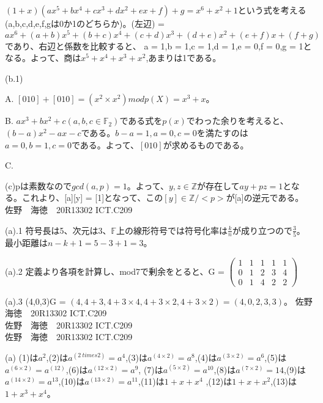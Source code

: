 \documentclass[11pt]{jsarticle}
\begin{document}
$(1 + x)(ax^5 + bx^4 + cx^3 + dx^2 + ex + f) + g = x^6 + x^2 + 1$という式を考える(a,b,c,d,e,f,gは0か1のどちらか)。(左辺) = $ax^6 + (a + b)x^5 + (b + c)x^4 + (c + d)x^3 + (d + e)x^2 + (e + f)x + (f + g)$であり、右辺と係数を比較すると、
a = 1,b = 1,c = 1,d = 1,e = 0,f = 0,g = 1となる。よって、商は$x^5 + x^4 + x^3 + x^2$,あまりは1である。
\par (b.1)
\par A. $[010] + [010] = (x^2 \times x^2) mod p(X) = x^3 + x$。
\par B. $ax^3 + bx^2 + c(a,b,c \in \mathbb{F}_2)$である式を$p(x)$でわった余りを考えると、$(b - a)x^2 - ax - c$である。$b - a = 1,a = 0,c = 0$を満たすのは$a = 0,b = 1,c = 0$である。よって、$[010]$が求めるものである。
\par C.
\par (c)pは素数なので$gcd(a,p) = 1$。よって、$y,z \in \mathbb{Z}$が存在して$ ay + pz = 1 $となる。これより、[a][y] = [1]となって、この$[y] \in \mathbb{Z} / <p>$が[a]の逆元である。\newpage
佐野　海徳　20R13302 ICT.C209 \\
\par (a).1 符号長は5、次元は3、$\mathbb{F}$上の線形符号では符号化率は$\frac{k}{n}$が成り立つので$\frac{3}{5}$。最小距離は$n - k + 1 = 5 - 3 + 1 = 3$。
\par (a).2 定義より各項を計算し、mod7で剰余をとると、G = $\left(
\begin{array}{ccccc}
1 & 1 & 1 & 1 & 1 \\
0 & 1 & 2 & 3 & 4 \\
0 & 1 & 4 & 2 & 2
\end{array}
\right)$
\par (a).3 (4,0,3)G = $(4, 4 + 3, 4 + 3 \times 4, 4 + 3 \times 2, 4 + 3 \times 2) = (4,0,2,3,3)$。\newpage
佐野　海徳　20R13302 ICT.C209 \\
\newpage
佐野　海徳　20R13302 ICT.C209 \\
\newpage
佐野　海徳　20R13302 ICT.C209 \\
\par (a) (1)は$a^2$,(2)は$a^(2\ times 2) = a^4$,(3)は$a^(4\times 2) = a^8$,(4)は$a^(3 \times 2) = a^6$,(5)は$a^(6 \times 2) = a^(12)$,(6)は$a^(12 \times 2) = a^9$,
(7)は$a^(5 \times 2) = a^10$,(8)は$a^(7 \times 2) = 14$,(9)は$a^(14 \times 2) = a^13$,(10)は$a^(13\times 2) = a^11$,(11)は$1 + x + x^4$
,(12)は$1 + x + x^2$,(13)は$1 + x^3 + x^4$。
\end{document}
